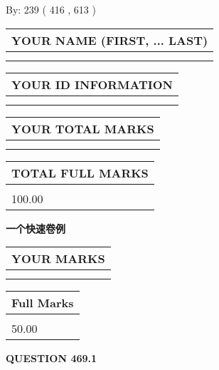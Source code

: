 \documentclass{ctexart}
\begin{document}
   
\hspace{1.0in} By: 
 239 ( 416 ,  613 )
   
   
   
   
\newpage 
\setcounter{page}{ 
   469001 } 
   
   
   
   
\noindent\begin{tabular}{|l|}
\hline
YOUR NAME (FIRST, ... LAST)  \\
\hline
 \\ 
 \\ 
\hline
\end{tabular}
\hspace{0.05in} \begin{tabular}{|l|}
\hline
 YOUR   ID   INFORMATION  \\
\hline
 \\ 
 \\ 
\hline
\end{tabular}
   
   
\vspace{0.2in}\noindent\begin{tabular}{|l|}
\hline
YOUR TOTAL MARKS  \\
\hline
 \\ 
 \\ 
\hline
\end{tabular}
\hspace{0.05in} \begin{tabular}{|l|}
\hline
TOTAL FULL MARKS  \\
\hline
 \\ 
100.00 \\
\hline
\end{tabular}
   
   
 \vspace{0.2in}
{\LARGE {\textbf{ 一个快速卷例}}}
   
   
  
\vspace{0.2in}
  
\noindent\begin{tabular}{|l|}
\hline
 YOUR MARKS  \\
\hline
 \\ 
 \\ 
\hline
\end{tabular}
\hspace{0.05in} \begin{tabular}{|l|}
\hline
 Full Marks  \\
\hline
 \\ 
50.00 \\
\hline
\end{tabular}
{\textbf{\Large{QUESTION
469.1 
}}}
  
\end{document}
